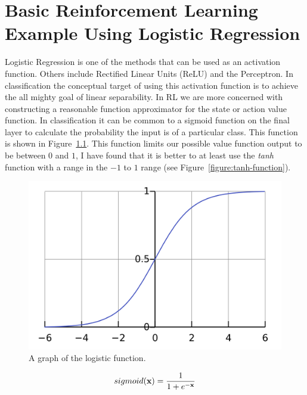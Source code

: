
\chapter{Basic Reinforcement Learning Example Using Logistic Regression }
\label{chapter:logistic-regression}

Logistic Regression is one of the methods that can be used as an activation function. Others include Rectified Linear Units (ReLU) and the Perceptron. In classification the conceptual target of using this activation function is to achieve the all mighty goal of linear separability. In RL we are more concerned with constructing a reasonable function approximator for the state or action value function. In classification it can be common to a sigmoid function on the final layer to calculate the probability the input is of a particular class. This function is shown in Figure~\ref{figure:logistic-function}. This function limits our possible value function output to be between $0$ and $1$, I have found that it is better to at least use the \textit{tanh} function with a range in the $-1$ to $1$ range (see Figure~\ref{figure:tanh-function}).

\begin{figure}
	\centering
	\label{figure:logistic-function}
	\includegraphics[width=0.95\linewidth]{../images/Logistic-curve.png}
	\caption{A graph of the logistic function.}
\end{figure}

\begin{equation}
	sigmoid(\textbf{x})=\frac{1}{1+e^{-\textbf{x}}}
\end{equation}  

